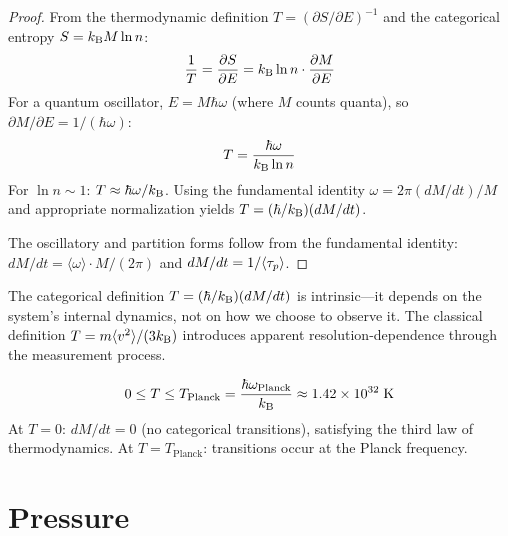 \begin{proof}
From the thermodynamic definition $T = (\partial S/\partial E)^{-1}$ and the categorical entropy $S = k_{\mathrm{B}} M \ln n$:
\begin{equation}
    \frac{1}{T} = \frac{\partial S}{\partial E} = k_{\mathrm{B}} \ln n \cdot \frac{\partial M}{\partial E}
\end{equation}
For a quantum oscillator, $E = M\hbar\omega$ (where $M$ counts quanta), so $\partial M/\partial E = 1/(\hbar\omega)$:
\begin{equation}
    T = \frac{\hbar\omega}{k_{\mathrm{B}} \ln n}
\end{equation}
For $\ln n \sim 1$: $T \approx \hbar\omega/k_{\mathrm{B}}$. Using the fundamental identity $\omega = 2\pi(dM/dt)/M$ and appropriate normalization yields $T = (\hbar/k_{\mathrm{B}})(dM/dt)$.

The oscillatory and partition forms follow from the fundamental identity: $dM/dt = \langle\omega\rangle \cdot M/(2\pi)$ and $dM/dt = 1/\langle\tau_p\rangle$.
\end{proof}

\begin{remark}
The categorical definition $T = (\hbar/k_{\mathrm{B}})(dM/dt)$ is intrinsic---it depends on the system's internal dynamics, not on how we choose to observe it. The classical definition $T = m\langle v^2\rangle/(3k_{\mathrm{B}})$ introduces apparent resolution-dependence through the measurement process.
\end{remark}

\begin{proposition}
\label{prop:temp_bounds}
\begin{equation}
    0 \leq T \leq T_{\mathrm{Planck}} = \frac{\hbar\omega_{\mathrm{Planck}}}{k_{\mathrm{B}}} \approx 1.42 \times 10^{32}\;\mathrm{K}
\end{equation}
At $T = 0$: $dM/dt = 0$ (no categorical transitions), satisfying the third law of thermodynamics. At $T = T_{\mathrm{Planck}}$: transitions occur at the Planck frequency.
\end{proposition}

\section{Pressure}
\label{sec:pressure}

